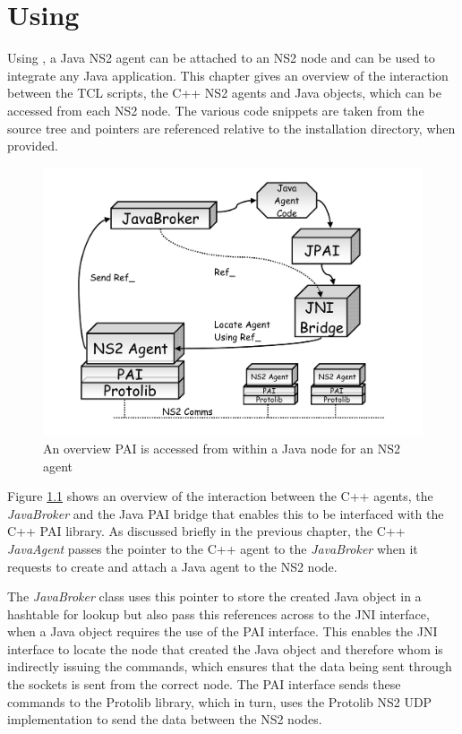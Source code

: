 \chapter{Using \agentj}
\label{jnipai}

Using \agentj, a Java NS2 agent can be attached to an NS2 node and
can be used to integrate any Java application. This chapter gives an 
overview of the interaction between the 
TCL scripts, the C++ NS2 agents and Java objects, which can be accessed from each
NS2 node.  The various code snippets are taken from the \agentj~
source tree and pointers are referenced relative to the
installation directory, when provided. 


\begin{figure}
\centering
\includegraphics[scale=0.4]{images/agentjJNIOverview}
\caption{An overview PAI is accessed from within a Java node for an NS2 agent} 
\label{jnipai:fig:overview}
\end{figure}

Figure \ref{jnipai:fig:overview} shows an overview of the 
interaction between the C++ agents, the \emph{JavaBroker}
and the Java PAI bridge that enables this to be interfaced with
the C++ PAI library. As discussed briefly in the previous
chapter, the C++  \emph{JavaAgent} passes the pointer to the C++
agent to the  \emph{JavaBroker} when it requests to create and
attach a Java agent to the NS2 node.  

The  \emph{JavaBroker}
class uses this pointer to store the created Java object in
a hashtable for lookup but also pass this references across to
the JNI interface, when a Java object requires the use of 
the PAI interface. This enables the JNI interface to locate the
node that created the Java object and therefore whom is
indirectly issuing the commands, which ensures that 
the data being sent through the sockets is sent from 
the correct node.  The PAI interface sends these commands
to the Protolib library, which in turn, uses the Protolib NS2 UDP
implementation to send the data between the NS2 nodes.


